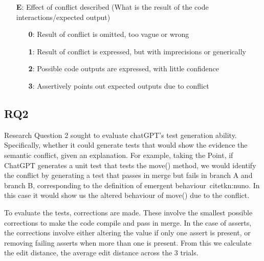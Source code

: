 \begin{itemize}
  \item[\textbf{E}:] Effect of conflict described (What is the result of the code interactions/expected output)
  \begin{itemize}
    \item[\textbf{0}:] Result of conflict is omitted, too vague or wrong
    \item[\textbf{1}:] Result of conflict is expressed, but with imprecisions or generically
    \item[\textbf{2}:] Possible code outputs are expressed, with little confidence
    \item[\textbf{3}:] Assertively points out expected outputs due to conflict
  \end{itemize}
\end{itemize}


\subsection{RQ2}

Research Question 2 sought to evaluate chatGPT's test generation ability. Specifically, whether it could generate tests that would show the evidence the semantic conflict, given an explanation.
For example, taking the Point, if ChatGPT generates a unit test that tests the move() method, we would identify the conflict by generating a test that passes in merge but fails in branch A and branch B, corresponding to the definition of emergent behaviour~citet{kn:nuno}.
In this case it would show us the altered behaviour of move() due to the conflict.

To evaluate the tests, corrections are made. These involve the smallest possible corrections to make the code compile and pass in merge. In the case of asserts, the corrections involve
either altering the value if only one assert is present, or removing failing asserts when more than one is present. From this we calculate the edit distance, the average edit distance across the 3 trials.

